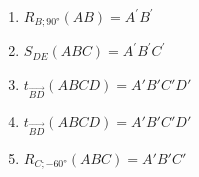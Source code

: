\begin{enumerate}
    \item $R_{B;\ang{90}}\left( AB \right) = A^{'}B^{'}$
          \begin{center}
            
          \end{center}
          \newpage
    \item $S_{DE}\left( ABC \right) = A^{'}B^{'}C^{'}$
          \begin{center}
            
          \end{center}
    \item $t_{\overrightarrow{BD}}\left( ABCD \right) = A'B'C'D'$
          \begin{center}
            
          \end{center}
    \item $t_{\overrightarrow{BD}}\left( ABCD \right) = A'B'C'D'$
          \begin{center}
            
          \end{center}
          \newpage
    \item $R_{C; \ang{-60}}\left( ABC \right) = A'B'C'$
          \begin{center}
            
          \end{center}
  \end{enumerate}
